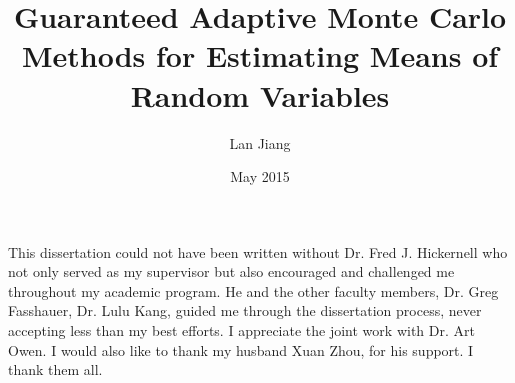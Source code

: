 \documentclass{iitthesis}
\begin{document}

\title{Guaranteed Adaptive Monte Carlo Methods for Estimating Means of Random Variables}
\author{Lan Jiang}
 
\date{May 2015}
\maketitle                %


\prelimpages         %


\begin{acknowledgement}     %
\par  This dissertation could not have been written without Dr. Fred
J. Hickernell who not only served as my supervisor but also
encouraged and challenged me throughout my academic program. He and
the other faculty members, Dr. Greg Fasshauer,
Dr. Lulu Kang, guided me through the dissertation process,
never accepting less than my best efforts. I appreciate the joint
work with Dr. Art Owen. I would
also like to thank my husband Xuan Zhou, for his support. I thank them all.
\end{acknowledgement}


\tableofcontents
 \clearpage

\listoftables

\clearpage

\listoffigures

\clearpage
\end{document}
